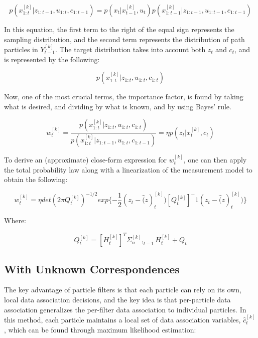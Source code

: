 \documentclass[twoside]{article}
\begin{document}
\begin{equation}
p(x_{1:t}^{[k]}|z_{1:t-1},u_{1:t},c_{1:t-1})=p(x_t|x_{t-1}^{[k]},u_t)p(x_{1:t-1}^{[k]}|z_{1:t-1},u_{1:t-1},c_{1:t-1})
\end{equation}

In this equation, the first term to the right of the equal sign represents the sampling distribution, and the second term represents the distribution of path particles in $Y_{t-1}^{[k]}$.  The target distribution takes into account both $z_t$ and $c_t$, and is represented by the following:

\begin{equation}
p(x_{1:t}^{[k]}|z_{1:t},u_{1:t},c_{1:t})
\end{equation}

Now, one of the most crucial terms, the importance factor, is found by taking what is desired, and dividing by what is known, and by using Bayes' rule.

\begin{equation}
w_t^{[k]}=\frac{p(x_{1:t}^{[k]}|z_{1:t},u_{1:t},c_{1:t})}{p(x_{1:t}^{[k]}|z_{1:t-1},u_{1:t},c_{1:t-1})}=\eta p(z_t|x_t^{[k]},c_t)
\end{equation}

To derive an (approximate) close-form expression for $w_t^{[k]}$, one can then apply the total probability law along with a linearization of the measurement model to obtain the following:

\begin{equation}
w_t^{[k]}=\eta det(2\pi Q_t^{[k]})^{-1/2}exp\{-\frac{1}{2}(z_t-\hat(z)_t^{[k]})[Q_t^{[k]}]^-1(z_t-\hat(z)_t^{[k]})\}
\end{equation}

Where:

\begin{equation}
Q_t^{[k]}=[H_t^{[k]}]^T\Sigma_n^{[k]},_{t-1}H_t^{[k]}+Q_t
\end{equation}


\subsection{With Unknown Correspondences}

The key advantage of particle filters is that each particle can rely on its own, local data association decisions, and the key idea is that per-particle data association generalizes the per-filter data association to individual particles.  In this method, each particle maintains a local set of data association variables, $\hat{c}_t^{[k]}$, which can be found through maximum likelihood estimation:
\end{document}
